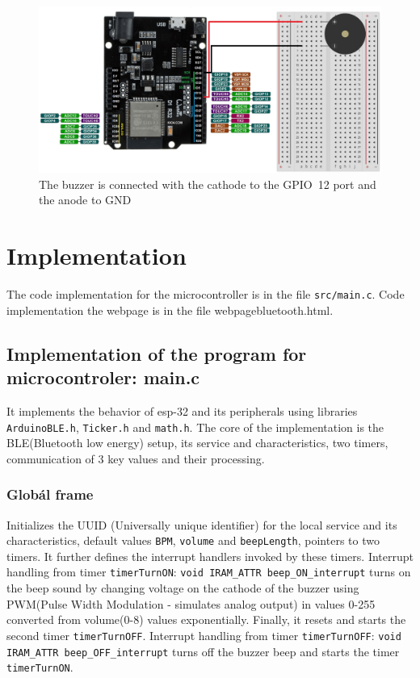 \documentclass[a4paper, 11pt, twocolumn]{article}
\begin{document}
	
    \begin{figure}[ht]
		\centering
		\includegraphics[width=0.8 \linewidth]{circuit_schema.jpg}

		\caption{The buzzer is connected with the cathode to the GPIO~12 port and the anode to GND}
		\label{fig:circuit}
	\end{figure}
	\section{Implementation}
    	The code implementation for the microcontroller is in the file \texttt{src/main.c}. Code implementation
        the webpage is in the file webpage\textunderscore bluetooth.html.

	\subsection{Implementation of the program for microcontroler: main.c}
        It implements the behavior of esp-32 and its peripherals using libraries \texttt{ArduinoBLE.h}, 
        \texttt{Ticker.h} and \texttt{math.h}. The core of the implementation is the BLE(Bluetooth low energy) setup,
         its service and characteristics, two timers, communication of 3 key values and their processing.
    
    \subsubsection{Globál frame}
        Initializes the UUID (Universally unique identifier) for the local service and its characteristics,
         default values \texttt{BPM}, \texttt{volume} and \texttt{beepLength}, pointers to two timers.
         It further defines the interrupt handlers invoked by these timers. Interrupt handling from timer
         \texttt{timerTurnON}: \texttt{void IRAM\_ATTR beep\_ON\_interrupt} turns on the beep sound by changing
         voltage on the cathode of the buzzer using PWM(Pulse Width Modulation - simulates analog output) in values 
         0-255 converted from volume(0-8) values exponentially. Finally, it resets and starts the second timer 
         \texttt{timerTurnOFF}. Interrupt handling from timer \texttt{timerTurnOFF}: \texttt{void IRAM\_ATTR 
         beep\_OFF\_interrupt} turns off the buzzer beep and starts the timer \texttt{timerTurnON}.
\end{document}
